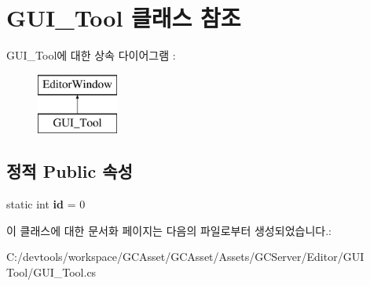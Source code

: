 \hypertarget{class_g_u_i___tool}{}\section{G\+U\+I\+\_\+\+Tool 클래스 참조}
\label{class_g_u_i___tool}
G\+U\+I\+\_\+\+Tool에 대한 상속 다이어그램 \+: \begin{figure}[H]
\begin{center}
\leavevmode
\includegraphics[height=2.000000cm]{class_g_u_i___tool}
\end{center}
\end{figure}
\subsection*{정적 Public 속성}
\begin{DoxyCompactItemize}
\item 
\hypertarget{class_g_u_i___tool_ae7c4ab7606a82034a55f41ba834b787c}{}static int {\bfseries id} = 0\label{class_g_u_i___tool_ae7c4ab7606a82034a55f41ba834b787c}

\end{DoxyCompactItemize}


이 클래스에 대한 문서화 페이지는 다음의 파일로부터 생성되었습니다.\+:\begin{DoxyCompactItemize}
\item 
C\+:/devtools/workspace/\+G\+C\+Asset/\+G\+C\+Asset/\+Assets/\+G\+C\+Server/\+Editor/\+G\+U\+I Tool/G\+U\+I\+\_\+\+Tool.\+cs\end{DoxyCompactItemize}
